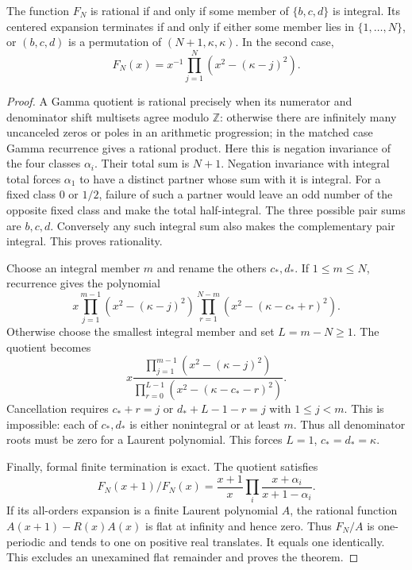 \begin{theorem}
\label{dterm:thm:classification}
The function $F_N$ is rational if and only if some member of
$\{b,c,d\}$ is integral. Its centered expansion terminates if and
only if either some member lies in $\{1,\ldots,N\}$, or
$(b,c,d)$ is a permutation of $(N+1,\kappa,\kappa)$.
In the second case,
\[
 F_N(x)=x^{-1}\prod_{j=1}^N(x^2-(\kappa-j)^2).
\]
\end{theorem}
\begin{proof}
A Gamma quotient is rational precisely when its numerator and denominator
shift multisets agree modulo $\mathbb Z$: otherwise there are infinitely
many uncanceled zeros or poles in an arithmetic progression; in the
matched case Gamma recurrence gives a rational product. Here this is
negation invariance of the four classes $\alpha_i$. Their total sum is
$N+1$. Negation invariance with integral total forces $\alpha_1$ to
have a distinct partner whose sum with it is integral. For a fixed class
$0$ or $1/2$, failure of such a partner would leave an odd number of
the opposite fixed class and make the total half-integral. The three
possible pair sums are $b,c,d$. Conversely any such integral sum
also makes the complementary pair integral. This proves rationality.

Choose an integral member $m$ and rename the others $c_*,d_*$. If
$1\le m\le N$, recurrence gives the polynomial
\[
 x\prod_{j=1}^{m-1}(x^2-(\kappa-j)^2)
   \prod_{r=1}^{N-m}(x^2-(\kappa-c_*+r)^2).
\]
Otherwise choose the smallest integral member and set $L=m-N\ge1$.
The quotient becomes
\[
 x\frac{\prod_{j=1}^{m-1}(x^2-(\kappa-j)^2)}
         {\prod_{r=0}^{L-1}(x^2-(\kappa-c_*-r)^2)}.
\]
Cancellation requires $c_*+r=j$ or $d_*+L-1-r=j$ with
$1\le j<m$. This is impossible: each of $c_*,d_*$ is either
nonintegral or at least $m$. Thus all denominator roots must be zero
for a Laurent polynomial. This forces $L=1$, $c_*=d_*=\kappa$.

Finally, formal finite termination is exact. The quotient satisfies
\[
 F_N(x+1)/F_N(x)=\frac{x+1}{x}
                     \prod_i\frac{x+\alpha_i}{x+1-\alpha_i}.
\]
If its all-orders expansion is a finite Laurent polynomial $A$, the
rational function $A(x+1)-R(x)A(x)$ is flat at infinity and hence zero.
Thus $F_N/A$ is one-periodic and tends to one on positive real
translates. It equals one identically. This excludes an unexamined
flat remainder and proves the theorem.
\end{proof}

